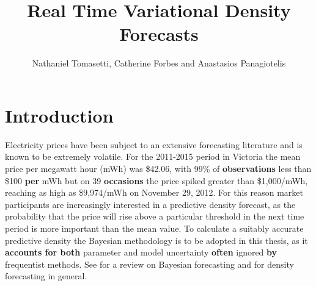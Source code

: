 \documentclass[12pt,a4paper]{article}%
\title{Real Time Variational Density Forecasts}
\author{Nathaniel Tomasetti, Catherine Forbes and Anastasios Panagiotelis}
\numberwithin{equation}{section}
\begin{document}
\maketitle
\tableofcontents
\section{Introduction} \label{sec:Intro}

Electricity prices have been subject to an extensive forecasting literature and is known to be extremely volatile. For the 2011-2015 period in Victoria the mean price per megawatt hour (mWh) was \$42.06, with 99\% of {\bf observations} less than \$100 {\bf per} %
mWh but on 39 {\bf occasions} the price spiked greater than \$1,000/mWh, reaching as high as \$9,974/mWh on November 29, 2012. 
For this reason market participants are increasingly interested in a predictive density forecast, as the probability that the price will rise above a particular threshold in the next time period is more important than the mean value. To calculate a suitably accurate predictive density the Bayesian methodology is to be adopted in this thesis, as it {\bf accounts for both } parameter and model uncertainty {\bf often} ignored {\bf by} frequentist methods. 
See \citet{Geweke2006} for a review on Bayesian forecasting and \citet{Gneiting2014} for density forecasting in general. 

\end{document}
